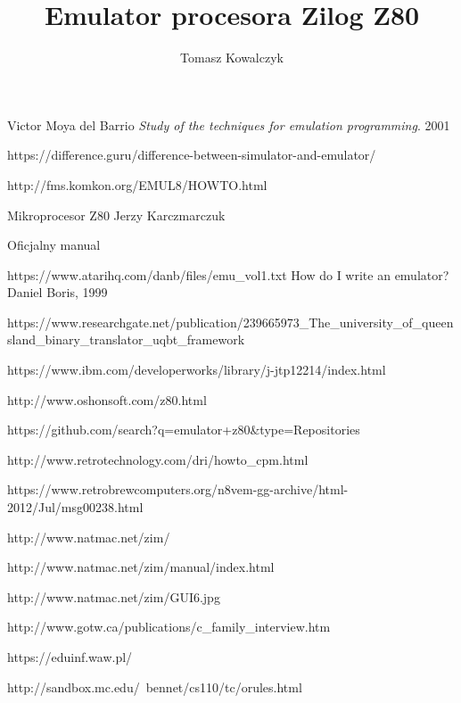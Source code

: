 \documentclass[12pt]{report}
\author{Tomasz Kowalczyk}
\title{Emulator procesora Zilog Z80}
\begin{document}
	\maketitle
	\tableofcontents
	
	
	
	
	
		
		
	
	
	
	
	
	
	
	\begin{thebibliography}{9}
		Victor Moya del Barrio
		\emph{Study of the techniques for emulation programming}.
		2001
		
		https://difference.guru/difference-between-simulator-and-emulator/
		
		http://fms.komkon.org/EMUL8/HOWTO.html
		
		Mikroprocesor Z80 Jerzy Karczmarczuk
		
		Oficjalny manual
		
		 https://www.atarihq.com/danb/files/emu\_vol1.txt
		How do I write an emulator? Daniel Boris, 1999
		
		https://www.researchgate.net/publication/239665973\_The\_university\_of\_queensland\_binary\_translator\_uqbt\_framework
		
		https://www.ibm.com/developerworks/library/j-jtp12214/index.html
		
		http://www.oshonsoft.com/z80.html
		
		https://github.com/search?q=emulator+z80\&type=Repositories
		
		http://www.retrotechnology.com/dri/howto\_cpm.html
		
		https://www.retrobrewcomputers.org/n8vem-gg-archive/html-2012/Jul/msg00238.html

		http://www.natmac.net/zim/
		
		http://www.natmac.net/zim/manual/index.html
		
		http://www.natmac.net/zim/GUI6.jpg
		
		http://www.gotw.ca/publications/c\_family\_interview.htm
		
		https://eduinf.waw.pl/
		
		http://sandbox.mc.edu/~bennet/cs110/tc/orules.html
				
	\end{thebibliography}
	
\end{document}
